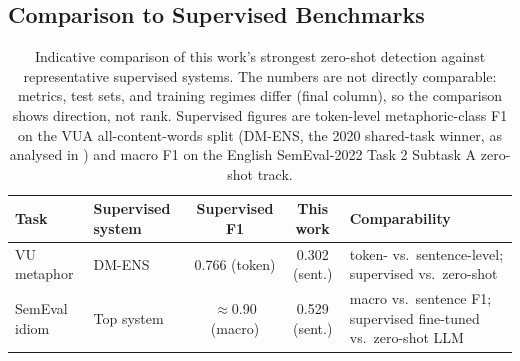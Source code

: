 \subsection{Comparison to Supervised Benchmarks}

\begin{table}[h!]
\centering
\small
\begin{tabular}{llccp{3.6cm}}
\hline
\textbf{Task} & \textbf{Supervised system} & \textbf{Supervised F1} & \textbf{This work} & \textbf{Comparability} \\
\hline
VU metaphor   & DM-ENS \cite{Neidlein2020}                          & 0.766 (token) & 0.302 (sent.) & token- vs.\ sentence-level; supervised vs.\ zero-shot \\
SemEval idiom & Top system \cite{tayyar-madabushi-etal-2022-semeval} & $\approx$0.90 (macro) & 0.529 (sent.) & macro vs.\ sentence F1; supervised fine-tuned vs.\ zero-shot LLM \\
\hline
\end{tabular}
\caption{Indicative comparison of this work's strongest zero-shot detection against representative supervised systems. The numbers are not directly comparable: metrics, test sets, and training regimes differ (final column), so the comparison shows direction, not rank. Supervised figures are token-level metaphoric-class F1 on the VUA all-content-words split (DM-ENS, the 2020 shared-task winner, as analysed in \cite{Neidlein2020}) and macro F1 on the English SemEval-2022 Task 2 Subtask A zero-shot track.}
\label{tab:rq1-supervised}
\end{table}

